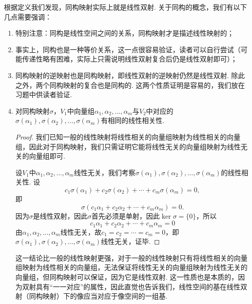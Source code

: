 根据定义我们发现，同构映射实际上就是线性双射. 关于同构的概念，我们有以下几点需要强调：
\begin{enumerate}
    \item 特别注意：同构是线性空间之间的关系，同构映射才是描述线性映射的；

    \item 事实上，同构也是一种等价关系，这一点很容易验证，读者可以自行尝试（可能传递性略有困难，实际上只需说明线性双射复合后仍是线性双射即可）；

    \item 同构映射的逆映射也是同构映射，即线性双射的逆映射仍然是线性双射. 除此之外，两个同构映射的复合也是同构的. 这两个性质证明是容易的，我们放在习题中供读者验证.

    \item 对同构映射$\sigma$，$V_1$中向量组$ \alpha_1,\alpha_2,\ldots,\alpha_m $与$V_2$中对应的$ \sigma(\alpha_1),\sigma(\alpha_2),\ldots,\sigma(\alpha_m) $有相同的线性相关性.

          \begin{proof}
              我们已知一般的线性映射将线性相关的向量组映射为线性相关的向量组，因此对于同构映射，我们只需证明它能将线性无关的向量组映射为线性无关的向量组即可.

              设$V_1$中$\alpha_1,\alpha_2,\ldots,\alpha_m$线性无关，我们考察$\sigma(\alpha_1),\sigma(\alpha_2),\ldots,\sigma(\alpha_m)$的线性相关性. 设
              \[c_1\sigma(\alpha_1)+c_2\sigma(\alpha_2)+\cdots+c_m\sigma(\alpha_m)=0,\]
              即
              \[\sigma(c_1\alpha_1+c_2\alpha_2+\cdots+c_m\alpha_m)=0.\]
              因为$\sigma$是线性双射，因此$\sigma$首先必须是单射，因此$\ker\sigma=\{0\}$，所以
              \[c_1\alpha_1+c_2\alpha_2+\cdots+c_m\alpha_m=0\]
              由$\alpha_1,\alpha_2,\ldots,\alpha_m$线性无关，故$c_1=c_2=\cdots=c_m=0$，即$\sigma(\alpha_1),\sigma(\alpha_2),\ldots,\sigma(\alpha_m)$线性无关，证毕.
          \end{proof}

          这一结论比一般的线性映射更强，对于一般的线性映射只有将线性相关的向量组映射为线性相关的向量组，无法保证将线性无关的向量组映射为线性无关的向量组，但同构映射可以保证，因为它是线性双射. 这一性质也是本质的，因为双射具有``一一对应''的属性，因此直觉也告诉我们，线性空间的基在线性双射（同构映射）下的像应当对应于像空间的一组基.


\end{enumerate}
